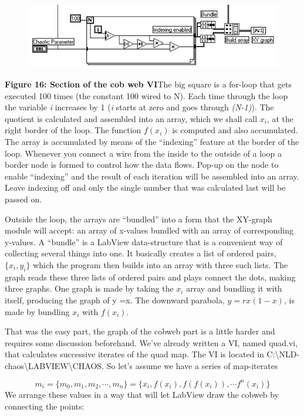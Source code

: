 \documentclass{../lab}
\begin{document}
\begin{figure}[h]
    \centering
    \href{http://experimentationlab.berkeley.edu/sites/default/files/images/Nldimage082.gif}{\includegraphics[width=0.5\linewidth]{images/Nldimage082.png}}
    \caption{}
    \label{fig:Nldimage082}
\end{figure}

\textbf{Figure 16: Section of the cob web VI}The big square is a for-loop that gets executed 100 times (the constant 100 wired to N). Each time through the loop the variable \emph{i} increases by 1 (\emph{i} starts at zero and goes through \emph{(N-1)}). The quotient is calculated and assembled into an array, which we shall call $x_i$, at the right border of the loop. The function $f(x_i)$ is computed and also accumulated. The array is accumulated by means of the ``indexing'' feature at the border of the loop. Whenever you connect a wire from the inside to the outside of a loop a border node is formed to control how the data flows. Pop-up on the node to enable ``indexing'' and the result of each iteration will be assembled into an array. Leave indexing off and only the single number that was calculated last will be passed on.

Outside the loop, the arrays are ``bundled'' into a form that the XY-graph module will accept: an array of x-values bundled with an array of corresponding y-values. A ``bundle'' is a LabView data-structure that is a convenient way of collecting several things into one. It basically creates a list of ordered pairs, $ \{x_i,y_i\} $ which the program then builds into an array with three such lists. The graph reads these three lists of ordered pairs and plays connect the dots, making three graphs. One graph is made by taking the $x_i$ array and bundling it with itself, producing the graph of y =x. The downward parabola, $ y=rx(1-x) $, is made by bundling $x_i$ with $ f(x_i) $.

That was the easy part, the graph of the cobweb part is a little harder and requires some discussion beforehand. We've already written a VI, named quad.vi, that calculates successive iterates of the quad map. The VI is located in C:\textbackslash NLD-chaos\textbackslash LABVIEW\textbackslash CHAOS. So let's assume we have a series of map-iterates

\begin{equation}
    m_i= \{m_0,m_1,m_2,\cdots ,m_n\}= \{x_i,f(x_i),f(f(x_i)),\cdots f^n(x_i)\}
\end{equation}
We arrange these values in a way that will let LabView draw the cobweb by connecting the points:
\end{document}
